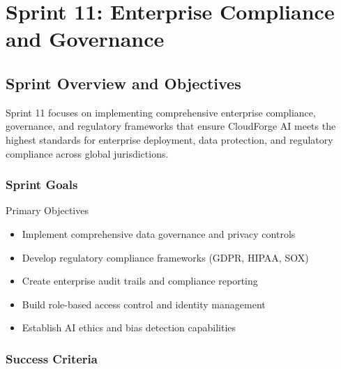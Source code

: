 \chapter{Sprint 11: Enterprise Compliance and Governance}

\section{Sprint Overview and Objectives}

Sprint 11 focuses on implementing comprehensive enterprise compliance, governance, and regulatory frameworks that ensure CloudForge AI meets the highest standards for enterprise deployment, data protection, and regulatory compliance across global jurisdictions.

\subsection{Sprint Goals}

\begin{sprintbox}{Primary Objectives}
\begin{itemize}
    \item Implement comprehensive data governance and privacy controls
    \item Develop regulatory compliance frameworks (GDPR, HIPAA, SOX)
    \item Create enterprise audit trails and compliance reporting
    \item Build role-based access control and identity management
    \item Establish AI ethics and bias detection capabilities
\end{itemize}
\end{sprintbox}

\subsection{Success Criteria}

